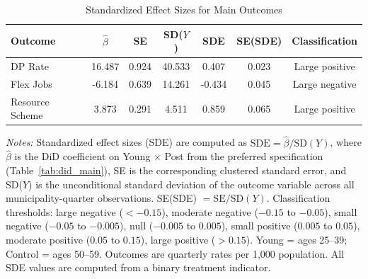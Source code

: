 \begin{table}[htbp]
\centering
\caption{Standardized Effect Sizes for Main Outcomes}
\label{tab:sde}
\small
\begin{tabular}{lcccccc}
\toprule
Outcome & $\hat{\beta}$ & SE & SD($Y$) & SDE & SE(SDE) & Classification \\
\midrule
DP Rate & 16.487 & 0.924 & 40.533 & 0.407 & 0.023 & Large positive \\
Flex Jobs & -6.184 & 0.639 & 14.261 & -0.434 & 0.045 & Large negative \\
Resource Scheme & 3.873 & 0.291 & 4.511 & 0.859 & 0.065 & Large positive \\
\bottomrule
\end{tabular}
\begin{tablenotes}
\small
\item \textit{Notes:} Standardized effect sizes (SDE) are computed as $\text{SDE} = \hat{\beta} / \text{SD}(Y)$, where $\hat{\beta}$ is the DiD coefficient on Young $\times$ Post from the preferred specification (Table~\ref{tab:did_main}), SE is the corresponding clustered standard error, and SD($Y$) is the unconditional standard deviation of the outcome variable across all municipality-quarter observations. SE(SDE) $= \text{SE} / \text{SD}(Y)$. Classification thresholds: large negative ($<-0.15$), moderate negative ($-0.15$ to $-0.05$), small negative ($-0.05$ to $-0.005$), null ($-0.005$ to $0.005$), small positive ($0.005$ to $0.05$), moderate positive ($0.05$ to $0.15$), large positive ($>0.15$). Young = ages 25--39; Control = ages 50--59. Outcomes are quarterly rates per 1,000 population. All SDE values are computed from a binary treatment indicator.
\end{tablenotes}
\end{table}
